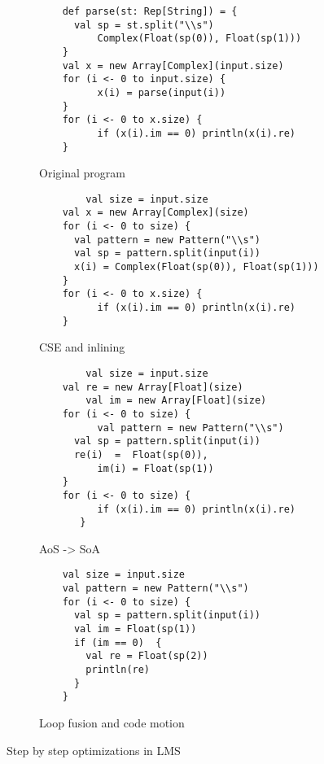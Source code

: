 \begin{figure*}
  \begin{subfigure}[b]{.5\linewidth}
    \begin{lstlisting}
  	def parse(st: Rep[String]) = {               
	  val sp = st.split("\\s")
          Complex(Float(sp(0)), Float(sp(1)))
	}
	val x = new Array[Complex](input.size)
	for (i <- 0 to input.size) {
     	  x(i) = parse(input(i)) 
	}
	for (i <- 0 to x.size) {
    	  if (x(i).im == 0) println(x(i).re) 
	}
    \end{lstlisting}
    \caption{Original program}
    \label{lst:original}
  \end{subfigure}
  \begin{subfigure}[b]{.5\linewidth}
    \begin{lstlisting}
        val size = input.size
	val x = new Array[Complex](size)
	for (i <- 0 to size) {
   	  val pattern = new Pattern("\\s") 
	  val sp = pattern.split(input(i))
	  x(i) = Complex(Float(sp(0)), Float(sp(1))) 
	}
	for (i <- 0 to x.size) {
          if (x(i).im == 0) println(x(i).re) 
	}
    \end{lstlisting}
    \caption{CSE and inlining} 
    \label{lst:cse-inline}
  \end{subfigure}
  \begin{subfigure}[b]{.5\linewidth}
    \begin{lstlisting}
        val size = input.size
	val re = new Array[Float](size)
        val im = new Array[Float](size)
	for (i <- 0 to size) {
          val pattern = new Pattern("\\s") 
   	  val sp = pattern.split(input(i))
	  re(i)  =  Float(sp(0)),
          im(i) = Float(sp(1)) 
	}
	for (i <- 0 to size) {
          if (x(i).im == 0) println(x(i).re) 
       }
    \end{lstlisting}
    \caption{AoS -> SoA}
    \label{lst:aos-soa}
  \end{subfigure}
\begin{subfigure}[b]{.5\linewidth}
    \begin{lstlisting}
	val size = input.size
	val pattern = new Pattern("\\s") 
	for (i <- 0 to size) {
	  val sp = pattern.split(input(i))
 	  val im = Float(sp(1))
	  if (im == 0)  {
	    val re = Float(sp(2))
 	    println(re)
   	  }
	}
    \end{lstlisting}
    \caption{Loop fusion and code motion}
    \label{lst:fusion-motion}
  \end{subfigure}
  \caption{Step by step optimizations in LMS}
  \label{lst:step-by-step-lms}
\end{figure*}
